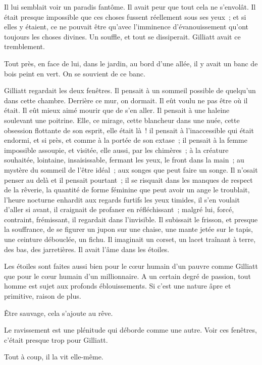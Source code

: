 \documentclass[french,twoside]{book} %
\begin{document}
Il lui semblait voir un paradis fantôme. Il avait peur que tout cela ne s’envolât. Il était presque impossible que ces choses fussent réellement sous ses yeux ; et si elles y étaient, ce ne pouvait être qu’avec l’imminence d’évanouissement qu’ont toujours les choses divines. Un souffle, et tout se dissiperait. Gilliatt avait ce tremblement.\par
Tout près, en face de lui, dans le jardin, au bord d’une allée, il y avait un banc de bois peint en vert. On se souvient de ce banc.\par
Gilliatt regardait les deux fenêtres. Il pensait à un sommeil possible de quelqu’un dans cette chambre. Derrière ce mur, on dormait. Il eût voulu ne pas être où il était. Il eût mieux aimé mourir que de s’en aller. Il pensait à une haleine soulevant une poitrine. Elle, ce mirage, cette blancheur dans une nuée, cette obsession flottante de son esprit, elle était là ! il pensait à l’inaccessible qui était endormi, et si près, et comme à la portée de son extase ; il pensait à la femme impossible assoupie, et visitée, elle aussi, par les chimères ; à la créature souhaitée, lointaine, insaisissable, fermant les yeux, le front dans la main ; au mystère du sommeil de l’être idéal ; aux songes que peut faire un songe. Il n’osait penser au delà et il pensait pourtant ; il se risquait dans les manques de respect de la rêverie, la quantité de forme féminine  que peut avoir un ange le troublait, l’heure nocturne enhardit aux regards furtifs les yeux timides, il s’en voulait d’aller si avant, il craignait de profaner en réfléchissant ; malgré lui, forcé, contraint, frémissant, il regardait dans l’invisible. Il subissait le frisson, et presque la souffrance, de se figurer un jupon sur une chaise, une mante jetée sur le tapis, une ceinture débouclée, un fichu. Il imaginait un corset, un lacet traînant à terre, des bas, des jarretières. Il avait l’âme dans les étoiles.\par
Les étoiles sont faites aussi bien pour le cœur humain d’un pauvre comme Gilliatt que pour le cœur humain d’un millionnaire. A un certain degré de passion, tout homme est sujet aux profonds éblouissements. Si c’est une nature âpre et primitive, raison de plus.\par
Être sauvage, cela s’ajoute au rêve.\par
Le ravissement est une plénitude qui déborde comme une autre. Voir ces fenêtres, c’était presque trop pour Gilliatt.\par
Tout à coup, il la vit elle-même.\par
\end{document}

